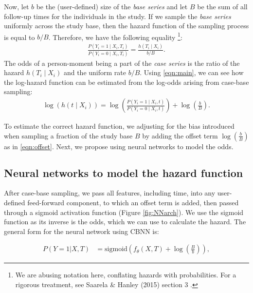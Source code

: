 \documentclass[AMA,STIX1COL,]{WileyNJD-v2}
\begin{document}
Now, let \(b\) be the (user-defined) size of the \emph{base series} and
let \(B\) be the sum of all follow-up times for the individuals in the
study. If we sample the \emph{base series} uniformly across the study
base, then the hazard function of the sampling process is equal to
\(b/B\). Therefore, we have the following equality
\footnote{We are abusing notation here, conflating hazards with probabilities. For a rigorous treatment, see Saarela \& Hanley (2015) section 3 \cite{saarela2015} .}:
\begin{align}\label{eqn:main}
\frac{P\left(Y_i=1 \mid X_i, T_i\right)}{P\left(Y_i = 0 \mid X_i, T_i\right)} = \frac{h\left(T_i \mid X_i\right)}{b/B}.
\end{align} The odds of a person-moment being a part of the \emph{case
series} is the ratio of the hazard \(h(T_i \mid X_i)\) and the uniform
rate \(b/B\). Using \eqref{eqn:main}, we can see how the log-hazard
function can be estimated from the log-odds arising from case-base
sampling: \begin{align}\label{eqn:offset}
\log \left( h\left(t \mid X_i\right)\right) = \log \left(\frac{P\left(Y_i = 1 \mid X_i, t\right)}{P\left(Y_i = 0 \mid X_i, t\right)}\right) + \log\left(\frac{b}{B}\right).
\end{align}

To estimate the correct hazard function, we adjusting for the bias
introduced when sampling a fraction of the study base \(B\) by adding
the offset term \(\log\left(\frac{b}{B} \right)\) as in
\eqref{eqn:offset}. Next, we propose using neural networks to model the
odds.

\hypertarget{neural-networks-to-model-the-hazard-function}{%
\subsection{Neural networks to model the hazard
function}\label{neural-networks-to-model-the-hazard-function}}

After case-base sampling, we pass all features, including time, into any
user-defined feed-forward component, to which an offset term is added,
then passed through a sigmoid activation function (Figure
\ref{fig:NNarch}). We use the sigmoid function as its inverse is the
odds, which we can use to calculate the hazard. The general form for the
neural network using CBNN is:

\begin{align}\label{eqn:nnProb}
P\left(Y=1|X,T\right)&=\mathrm{sigmoid}\left(f_{\theta}(X, T) + \log\left(\frac{B}{b}\right) \right),
\end{align}
\end{document}
